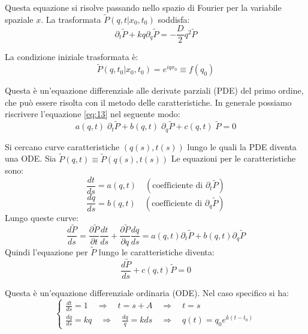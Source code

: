 Questa equazione si risolve passando nello spazio di Fourier per la variabile spaziale $x$. La trasformata $\tilde{P}(q,t|x_0,t_0)$ soddisfa:
\begin{equation}
\partial_{t}\tilde{P} + kq\partial_q\tilde{P} = -\frac{D}{2}q^{2}\tilde{P}
\label{eq:13}
\end{equation}

La condizione iniziale trasformata è:
\begin{equation}
\tilde{P}(q,t_{0}|x_{0},t_{0})=e^{iqx_{0}} \equiv f(q_0)
\end{equation}

Questa è un'equazione differenziale alle derivate parziali (PDE) del primo ordine, che può essere risolta con il metodo delle caratteristiche.
In generale possiamo riscrivere l'equazione \ref{eq:13} nel seguente modo:
\begin{equation}
a (q, t) \; \partial_t \tilde{P} + b(q,t) \; \partial_q \tilde{P} + c(q, t)\; \tilde{P} =0
\end{equation}

Si cercano curve caratteristiche $(q(s), t(s))$ lungo le quali la PDE diventa una ODE.
Sia $\tilde{P}(q,t) \equiv \tilde{P}(q(s), t(s))$
Le equazioni per le caratteristiche sono:
\begin{equation}
\frac{dt}{ds} = a(q, t) \quad (\text{coefficiente di } \partial_t \tilde{P})
\end{equation}
\begin{equation}
\frac{dq}{ds} = b(q,t) \quad (\text{coefficiente di } \partial_q \tilde{P})
\end{equation}
Lungo queste curve:
\begin{equation}
\frac{d\tilde{P}}{ds} = \frac{\partial \tilde{P}}{\partial t}\frac{dt}{ds} + \frac{\partial \tilde{P}}{\partial q}\frac{dq}{ds} = a(q,t)\partial_t \tilde{P} + b(q,t)\partial_q \tilde{P}
\end{equation}
Quindi l'equazione per $\tilde{P}$ lungo le caratteristiche diventa:
\begin{equation}
\frac{d\tilde{P}}{ds} + c(q,t)\tilde{P} =0
\end{equation}

Questa è un'equazione differenziale ordinaria (ODE).
Nel caso specifico si ha:
\begin{equation} \begin{cases}
\frac{dt}{ds} = 1 \quad \Rightarrow \quad t=s+A  \quad \Rightarrow \quad t=s \\ \frac{dq}{ds} = kq \quad \Rightarrow \quad \frac{dq}{q} = kds \quad \Rightarrow \quad q(t) = q_0 e^{k (t-t_0)} \end{cases}
\label{eq:20}
\end{equation}

